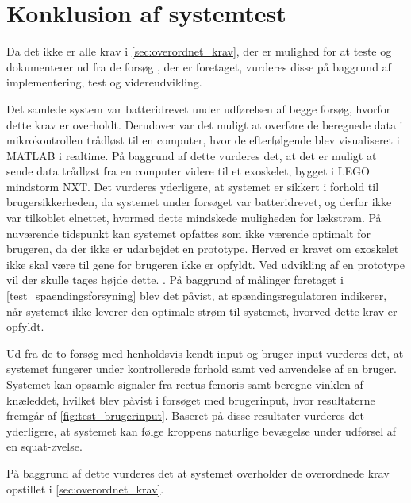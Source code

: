 \section{Konklusion af systemtest}
Da det ikke er alle krav i \autoref{sec:overordnet_krav}, der er mulighed for at teste og dokumenterer ud fra de forsøg , der er foretaget, vurderes disse på baggrund af implementering, test og videreudvikling. 

Det samlede system var batteridrevet under udførelsen af begge forsøg, hvorfor dette krav er overholdt. Derudover var det muligt at overføre de beregnede data i mikrokontrollen trådløst til en computer, hvor de efterfølgende blev visualiseret i MATLAB i realtime. På baggrund af dette vurderes det, at det er muligt at sende data trådløst fra en computer videre til et exoskelet, bygget i LEGO mindstorm NXT. Det vurderes yderligere, at systemet er sikkert i forhold til brugersikkerheden, da systemet under forsøget var batteridrevet, og derfor ikke var tilkoblet elnettet, hvormed dette mindskede muligheden for lækstrøm. 
På nuværende tidspunkt kan systemet opfattes som ikke værende optimalt for brugeren, da der ikke er udarbejdet en prototype. Herved er kravet om exoskelet ikke skal være til gene for brugeren ikke er opfyldt. Ved udvikling af en prototype vil der skulle tages højde dette. . 
På baggrund af målinger foretaget i \autoref{test_spaendingsforsyning} blev det påvist, at spændingsregulatoren indikerer, når systemet ikke leverer den optimale strøm til systemet, hvorved dette krav er opfyldt. 

Ud fra de to forsøg med henholdsvis kendt input og bruger-input vurderes det, at systemet fungerer under kontrollerede forhold samt ved anvendelse af en bruger. Systemet kan opsamle signaler fra rectus femoris samt beregne vinklen af knæleddet, hvilket blev påvist i forsøget med brugerinput, hvor resultaterne fremgår af \autoref{fig:test_brugerinput}. Baseret på disse resultater vurderes det yderligere, at systemet kan følge kroppens naturlige bevægelse under udførsel af en squat-øvelse. 

På baggrund af dette vurderes det at systemet overholder de overordnede krav opstillet i \autoref{sec:overordnet_krav}. 

